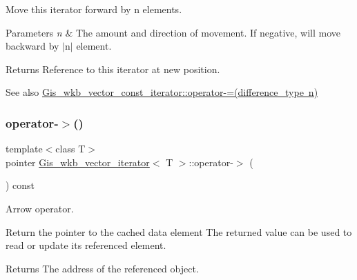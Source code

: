 Move this iterator forward by n elements. 


\begin{DoxyParams}{Parameters}
{\em n} & The amount and direction of movement. If negative, will move backward by $\vert$n$\vert$ element. \\
\hline
\end{DoxyParams}
\begin{DoxyReturn}{Returns}
Reference to this iterator at new position. 
\end{DoxyReturn}
\begin{DoxySeeAlso}{See also}
\mbox{\hyperlink{classGis__wkb__vector__const__iterator_a9a679f7fb5602553fadd480b08bee2f8}{Gis\+\_\+wkb\+\_\+vector\+\_\+const\+\_\+iterator\+::operator-\/=(difference\+\_\+type n)}} 
\end{DoxySeeAlso}
\mbox{\label{classGis__wkb__vector__iterator_a7ac69ef71d2ffff73e024a86ce68c679}} 
\subsubsection{\texorpdfstring{operator-\/$>$()}{operator->()}}
{\footnotesize\ttfamily template$<$class T$>$ \\
pointer \mbox{\hyperlink{classGis__wkb__vector__iterator}{Gis\+\_\+wkb\+\_\+vector\+\_\+iterator}}$<$ T $>$\+::operator-\/$>$ (\begin{DoxyParamCaption}{ }\end{DoxyParamCaption}) const\hspace{0.3cm}{\ttfamily [inline]}}



Arrow operator. 

Return the pointer to the cached data element The returned value can be used to read or update its referenced element. \begin{DoxyReturn}{Returns}
The address of the referenced object. 
\end{DoxyReturn}
\mbox{\label{classGis__wkb__vector__iterator_a48929642421f30c99ca89791121de93a}} 
